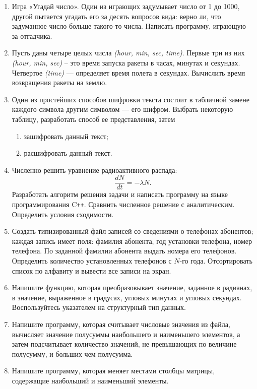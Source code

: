 \begin{enumerate}[leftmargin=*]
    \item Игра «Угадай число». Один из играющих задумывает число от 1 до 1000, другой пытается угадать его за десять вопросов вида: верно ли, что задуманное число больше такого-то числа. Написать программу, играющую за отгадчика.
    \item Пусть даны четыре целых числа \textit{(hour, min, sec, time)}. Первые три из них \textit{(hour, min, sec)} – это время запуска ракеты в часах, минутах и секундах. Четвертое \textit{(time)} –-- определяет время полета в секундах. Вычислить время возвращения ракеты на землю.
    \item Один из простейших способов шифровки текста состоит в табличной замене каждого символа другим символом --- его шифром. Выбрать некоторую таблицу, разработать способ ее представления, затем
    \begin{enumerate}[label=\asbuk*)]
        \item зашифровать данный текст;
        \item расшифровать данный текст.
    \end{enumerate}
    \item Численно решить уравнение радиоактивного распада:
    \begin{equation*}
        \dfrac{dN}{dt} = -\lambda N .
    \end{equation*}
    Разработать алгоритм решения  задачи и написать программу на языке программирования C\texttt{++}. Сравнить численное решение с аналитическим. Определить условия сходимости.
    \item Создать типизированный файл записей со сведениями о телефонах абонентов; каждая запись имеет поля: фамилия абонента, год установки телефона, номер телефона. По заданной фамилии абонента выдать номера его телефонов. Определить количество установленных телефонов с $N$-го года. Отсортировать список по алфавиту и вывести все записи на экран.
    \item Напишите функцию, которая преобразовывает значение, заданное в радианах, в значение, выраженное в градусах, угловых минутах и угловых секундах. Воспользуйтесь указателем на структурный тип данных.
    \item Напишите программу, которая считывает числовые значения из файла, вычисляет значение полусуммы наибольшего и наименьшего элементов, а затем подсчитывает количество значений, не превышающих по величине полусумму, и больших чем полусумма.
    \item Напишите программу, которая меняет местами столбцы матрицы, содержащие наибольший и наименьший элементы.

\end{enumerate}
